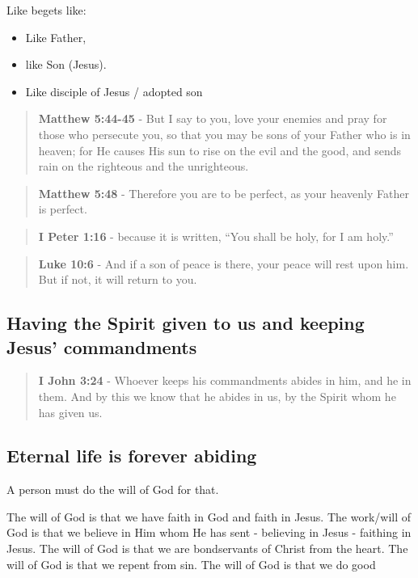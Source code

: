 \documentclass[11pt]{article}
\begin{document}
Like begets like:
\begin{itemize}
\item Like Father,
\item like Son (Jesus).
\item Like disciple of Jesus / adopted son
\end{itemize}

\begin{quote}
\textbf{Matthew 5:44-45} - But I say to you, love your enemies and pray for those who persecute you, so that you may be sons of your Father who is in heaven; for He causes His sun to rise on the evil and the good, and sends rain on the righteous and the unrighteous.
\end{quote}

\begin{quote}
\textbf{Matthew 5:48} - Therefore you are to be perfect, as your heavenly Father is perfect.
\end{quote}

\begin{quote}
\textbf{I Peter 1:16} - because it is written, “You shall be holy, for I am holy.”
\end{quote}

\begin{quote}
\textbf{Luke 10:6} - And if a son of peace is there, your peace will rest upon him. But if not, it will return to you.
\end{quote}

\subsection{Having the Spirit given to us and keeping Jesus' commandments}
\label{sec:org7c2b7d3}
\begin{quote}
\textbf{I John 3:24} - Whoever keeps his commandments abides in him, and he in them. And by this we know that he abides in us, by the Spirit whom he has given us.
\end{quote}

\subsection{Eternal life is forever abiding}
\label{sec:orgb65ec16}
A person must do the will of God for that.

The will of God is that we have faith in God and faith in Jesus.
The work/will of God is that we believe in Him whom He has sent - believing in Jesus - faithing in Jesus.
The will of God is that we are bondservants of Christ from the heart.
The will of God is that we repent from sin.
The will of God is that we do good
\end{document}
